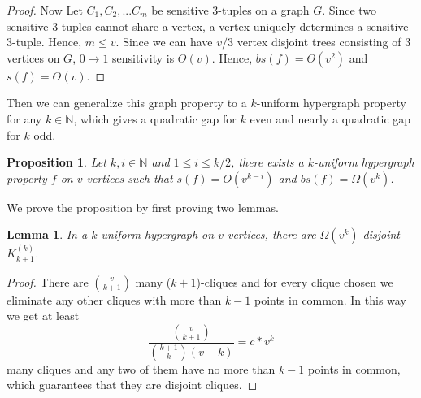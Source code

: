 \documentclass[psamsfonts]{amsart}
\newtheorem{prop}[theorem]{Proposition}
\newtheorem{lem}[theorem]{Lemma}
\theoremstyle{definition}
\theoremstyle{remark}
\numberwithin{equation}{section}
\begin{document}
\begin{proof}
Now Let $C_1, C_2, ... C_m$ be sensitive 3-tuples on a graph $G$. Since two sensitive 3-tuples cannot share a vertex, a vertex uniquely determines a sensitive 3-tuple. Hence, $m \leq v$. Since we can have $v/3$ vertex disjoint trees consisting of 3 vertices on $G$, $0 \rightarrow 1$ sensitivity is $\Theta(v)$.  
Hence, $bs(f) = \Theta(v^2)$ and $s(f) = \Theta(v)$.
\end{proof}

	Then we can generalize this graph property to a $k$-uniform hypergraph property for any $k \in \mathbb{N}$, which gives a quadratic gap for $k$ even and nearly a quadratic gap for $k$ odd.
		\begin{prop}
		Let $k,i \in \mathbb{N}$ and $1 \leq i \leq k/2$, there exists a $k$-uniform hypergraph property $f$ on $v$ vertices such that $s(f) = O(v^{k-i})$ and $bs(f) = \Omega (v^{k})$.
	\end{prop}
	We prove the proposition by first proving two lemmas.
	\begin{lem}
		In a $k$-uniform hypergraph on $v$ vertices, there are $\Omega (v^k)$ disjoint $K_{k+1}^{(k)}$.
	\end{lem}
	\begin{proof}
		There are $v \choose{k+1}$  many ($k+1$)-cliques and for every clique chosen we eliminate any other cliques with more than $k-1$ points in common. In this way we get at least
		\begin{equation}
			\frac{{v \choose{k+1}}}{{k+1 \choose{k}}(v-k)} = c*v^{k}
		\end{equation}		 
	many cliques and any two of them have no more than $k-1$ points in common, which guarantees that they are disjoint cliques.
	\end{proof}
\end{document}
